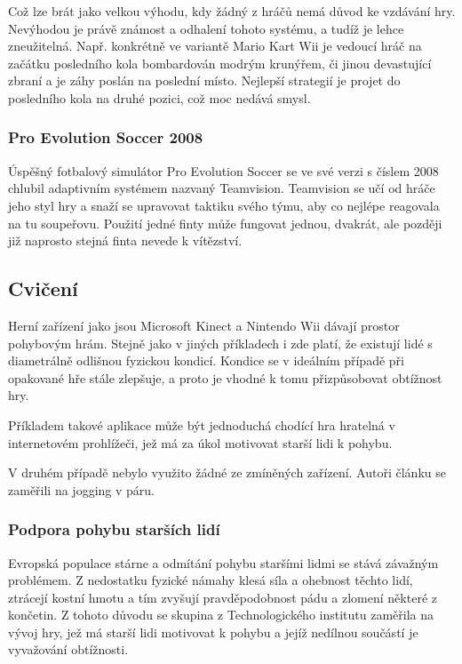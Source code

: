 Což lze brát jako velkou výhodu, kdy žádný z hráčů nemá důvod ke vzdávání hry. Nevýhodou je právě známost a odhalení tohoto systému, a tudíž je lehce zneužitelná. Např. konkrétně ve variantě Mario Kart Wii je vedoucí hráč na začátku posledního kola bombardován modrým krunýřem, či jinou devastující zbraní a je záhy poslán na poslední místo. Nejlepší strategií je projet do posledního kola na druhé pozici, což moc nedává smysl. \cite{5}

\subsubsection{Pro Evolution Soccer 2008}

Úspěšný fotbalový simulátor Pro Evolution Soccer se ve své verzi s číslem 2008 chlubil adaptivním systémem nazvaný Teamvision. Teamvision se učí od hráče jeho styl hry a snaží se upravovat taktiku svého týmu, aby co nejlépe reagovala na tu soupeřovu. Použití jedné finty může fungovat jednou, dvakrát, ale později již naprosto stejná finta nevede k vítězství. \cite{6}

\subsection{Cvičení}

Herní zařízení jako jsou Microsoft Kinect a Nintendo Wii dávají prostor pohybovým hrám. Stejně jako v jiných příkladech i zde platí, že existují lidé s diametrálně odlišnou fyzickou kondicí. Kondice se v ideálním případě při opakované hře stále zlepšuje, a proto je vhodné k tomu přizpůsobovat obtížnost hry.

Příkladem takové aplikace může být jednoduchá chodící hra hratelná v internetovém prohlížeči, jež má za úkol motivovat starší lidi k pohybu.

V druhém případě nebylo využito žádné ze zmíněných zařízení. Autoři článku \cite{7} se zaměřili na jogging v páru. 

\subsubsection{Podpora pohybu starších lidí}

Evropská populace stárne a odmítání pohybu staršími lidmi se stává závažným problémem. Z nedostatku fyzické námahy klesá síla a ohebnost těchto lidí, ztrácejí kostní hmotu a tím zvyšují pravděpodobnost pádu a zlomení některé z končetin. Z tohoto důvodu se skupina z Technologického institutu zaměřila na vývoj hry, jež má starší lidi motivovat k pohybu a jejíž nedílnou součástí je vyvažování obtížnosti. \cite{8}

